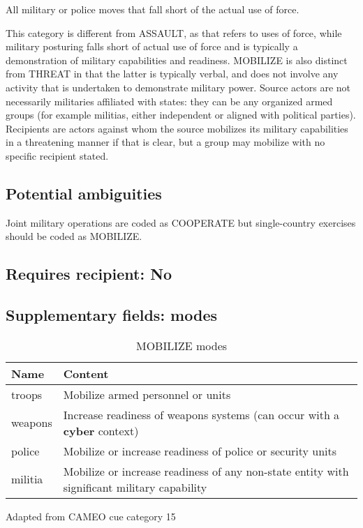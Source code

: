 \documentclass[11pt]{report}
\newcommand{\plcat}[1]{\textsf{#1}}
\newcommand{\plcon}[1]{\textbf{#1}}
\begin{document}
All military or police moves that fall short of the actual use of force. 

This category is different from \plcat{ASSAULT}, as that refers to uses of force, while military posturing falls short of actual use of force and is typically a demonstration of military capabilities and readiness. \plcat{MOBILIZE} is also distinct from \plcat{THREAT} in that the latter is typically verbal, and does not involve any activity that is undertaken to demonstrate military power. Source actors  are not necessarily militaries affiliated with states: they can be any organized armed groups (for example militias, either independent or aligned with political parties). Recipients are actors against whom the source mobilizes its military capabilities in a threatening manner if that is clear, but a group may mobilize with no specific recipient stated.

\subsection{Potential ambiguities}

Joint military operations are coded as \plcat{COOPERATE} but single-country exercises should be coded as \plcat{MOBILIZE}.

\subsection{Requires recipient: No}

\subsection{Supplementary fields: modes }

\begin{table}[htp]
\caption{MOBILIZE modes}
\begin{center}
\begin{tabular}{|l|p{13cm}|}
\hline
Name & Content \\
\hline
troops & Mobilize armed personnel or units\\
weapons & Increase readiness of weapons systems (can occur with a \plcon{cyber} context) \\
police & Mobilize or increase readiness of police or security units\\
militia & Mobilize or increase readiness of any non-state entity with significant military capability\\
\hline
\end{tabular}
\end{center}
\label{tab:mobilizemode}
Adapted from CAMEO cue category 15
\end{table}
\end{document}
